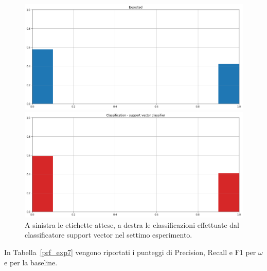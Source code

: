\documentclass[12pt]{report}
\theoremstyle{definition}
\begin{document}
\begin{figure}
\centering
    \begin{minipage}{0.48\textwidth}
        \includegraphics[width=\linewidth]{images/experiment_kaggle/expected_classification.png}
    \end{minipage}
    \begin{minipage}{0.48\textwidth}
        \includegraphics[width=\linewidth]{images/experiment_kaggle/prediction_classification_svc.png}
    \end{minipage}
    \caption{A sinistra le etichette attese, a destra le classificazioni effettuate dal classificatore support vector nel settimo esperimento.}
    \label{svc_exp7}
\end{figure} 
In Tabella~\ref{prf_exp7} vengono riportati i punteggi di Precision, Recall e F1 per $\omega$ e per la baseline.
\end{document}
